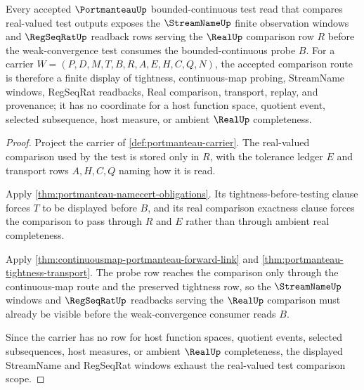 \begin{theorem}
\label{thm:portmanteau-regseqrat-test-window-scope}
Every accepted $\PortmanteauUp$ bounded-continuous test read that compares real-valued test outputs exposes the $\StreamNameUp$ finite observation windows and $\RegSeqRatUp$ readback rows serving the $\RealUp$ comparison row $R$ before the weak-convergence test consumes the bounded-continuous probe $B$. For a carrier $W=(P,D,M,T,B,R,A,E,H,C,Q,N)$, the accepted comparison route is therefore a finite display of tightness, continuous-map probing, StreamName windows, RegSeqRat readbacks, Real comparison, transport, replay, and provenance; it has no coordinate for a host function space, quotient event, selected subsequence, host measure, or ambient $\RealUp$ completeness.
\end{theorem}
\begin{proof}
Project the carrier of \autoref{def:portmanteau-carrier}. The real-valued comparison used by the test is stored only in $R$, with the tolerance ledger $E$ and transport rows $A,H,C,Q$ naming how it is read.

Apply \autoref{thm:portmanteau-namecert-obligations}. Its tightness-before-testing clause forces $T$ to be displayed before $B$, and its real comparison exactness clause forces the comparison to pass through $R$ and $E$ rather than through ambient real completeness.

Apply \autoref{thm:continuousmap-portmanteau-forward-link} and \autoref{thm:portmanteau-tightness-transport}. The probe row reaches the comparison only through the continuous-map route and the preserved tightness row, so the $\StreamNameUp$ windows and $\RegSeqRatUp$ readbacks serving the $\RealUp$ comparison must already be visible before the weak-convergence consumer reads $B$.

Since the carrier has no row for host function spaces, quotient events, selected subsequences, host measures, or ambient $\RealUp$ completeness, the displayed StreamName and RegSeqRat windows exhaust the real-valued test comparison scope.
\end{proof}



